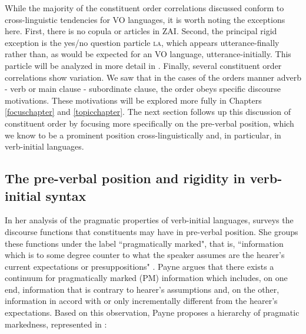 While the majority of the constituent order correlations discussed conform to cross-linguistic tendencies for VO languages, it is worth noting the exceptions here. First, there is no copula or articles in ZAI. Second, the principal rigid exception is the yes/no question particle \textsc{la}, which appears utterance-finally rather than, as would be expected for an VO language, utterance-initially. This particle will be analyzed in more detail in . Finally, several constituent order correlations show variation. We saw that in the cases of the orders manner adverb - verb or main clause - subordinate clause, the order obeys specific discourse motivations. These motivations will be explored more fully in Chapters \ref{focuschapter} and \ref{topicchapter}. The next section follows up this discussion of constituent order by focusing more specifically on the pre-verbal position, which we know to be a prominent position cross-linguistically and, in particular, in verb-initial languages.


\subsection{The pre-verbal position and rigidity in verb-initial syntax}

In her analysis of the pragmatic properties of verb-initial languages, \citet{payne1995} surveys the discourse functions that constituents may have in pre-verbal position. She groups these functions under the label ``pragmatically marked", that is, ``information which is to some degree counter to what the speaker assumes are the hearer's current expectations or presuppositions" \citep[110]{payne1995}. Payne argues that there exists a continuum for pragmatically marked (PM) information which includes, on one end, information that is contrary to hearer's assumptions and, on the other, information in accord with or only incrementally different from the hearer's expectations. Based on this observation, Payne proposes a hierarchy of pragmatic markedness, represented in :

